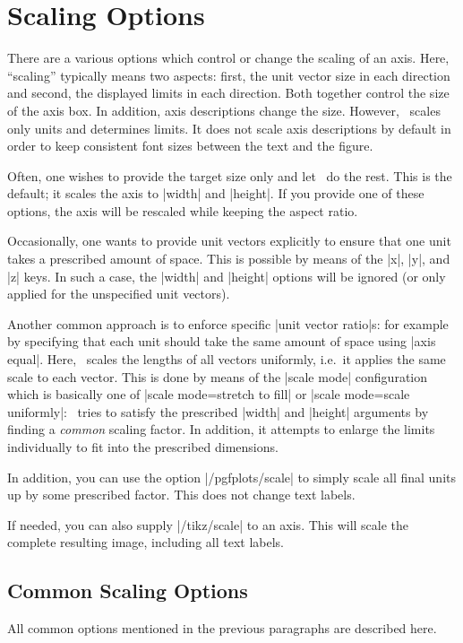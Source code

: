 
\section{Scaling Options}
There are a various options which control or change the scaling of an axis. Here, ``scaling'' typically means two aspects: first, the unit vector size in each direction and second, the displayed limits in each direction. Both together control the size of the axis box. In addition, axis descriptions change the size. However, \PGFPlots\ scales only units and determines limits. It does not scale axis descriptions by default in order to keep consistent font sizes between the text and the figure.

Often, one wishes to provide the target size only and let \PGFPlots\ do the rest. This is the default; it scales the axis to |width| and |height|. If you provide one of these options, the axis will be rescaled while keeping the aspect ratio. 

Occasionally, one wants to provide unit vectors explicitly to ensure that one unit takes a prescribed amount of space. This is possible by means of the |x|, |y|, and |z| keys. In such a case, the |width| and |height| options will be ignored (or only applied for the unspecified unit vectors).

Another common approach is to enforce specific |unit vector ratio|s: for example by specifying that each unit should take the same amount of space using |axis equal|. Here, \PGFPlots\ scales the lengths of all vectors uniformly, i.e.\ it applies the same scale to each vector. This is done by means of the |scale mode| configuration which is basically one of |scale mode=stretch to fill| or |scale mode=scale uniformly|: \PGFPlots\ tries to satisfy the prescribed |width| and |height| arguments by finding a \emph{common} scaling factor. In addition, it attempts to enlarge the limits individually to fit into the prescribed dimensions.

In addition, you can use the option |/pgfplots/scale| to simply scale all final units up by some prescribed factor. This does not change text labels. 

If needed, you can also supply |/tikz/scale| to an axis. This will scale the complete resulting image, including all text labels.

\subsection{Common Scaling Options}
All common options mentioned in the previous paragraphs are described here.

